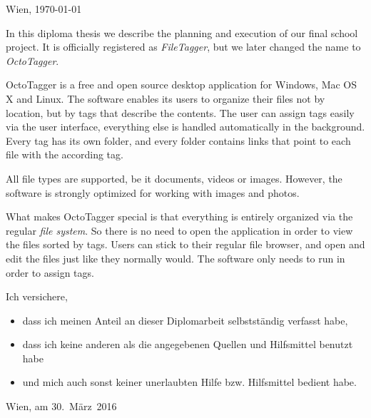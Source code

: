 \documentclass[12pt,a4paper,naustrian,english,oneside,openright,DIV=12,BCOR=1cm]{scrbook}
\begin{document}
\begin{titlepage}
\begin{center}
\vspace{5mm}
Wien, \today
\par\end{center}

\end{titlepage}%


\thispagestyle{fancy}
In this diploma thesis we describe the planning and execution of our final
school project. It is officially registered as \textit{FileTagger}, but we later changed the name to \textit{OctoTagger}.

OctoTagger is a free and open source desktop application for Windows, Mac OS X and Linux. The
software enables its users to organize their files not by location, but by tags
that describe the contents. The user can assign tags easily via the user
interface, everything else is handled automatically in the background. Every tag has its own folder, and every folder contains links that point to each file with
the according tag.

All file types are supported, be it documents, videos or images. However,
the software is strongly optimized for working with images and photos.

What makes OctoTagger special is that everything is entirely organized via the regular \emph{file system}. So there is no need to open the
application in order to view the files sorted by tags. Users can stick to their regular file browser, and open and edit the files just like they normally would. The software only needs to run in order to assign tags.


\thispagestyle{fancy}

Ich versichere,
\begin{itemize}
\item dass ich meinen Anteil an dieser Diplomarbeit selbstständig verfasst
habe,
\item dass ich keine anderen als die angegebenen Quellen und Hilfsmittel
benutzt habe
\item und mich auch sonst keiner unerlaubten Hilfe bzw. Hilfsmittel bedient
habe.
\end{itemize}
\bigskip{}
Wien, am 30.~März~2016 %
\end{document}
